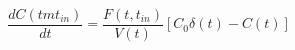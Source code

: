 \begin{equation}
\frac{dC(tmt_{in})}{dt} = \frac{F(t,t_{in})}{V(t)}[C_0\delta(t)-C(t)]
\end{equation}
